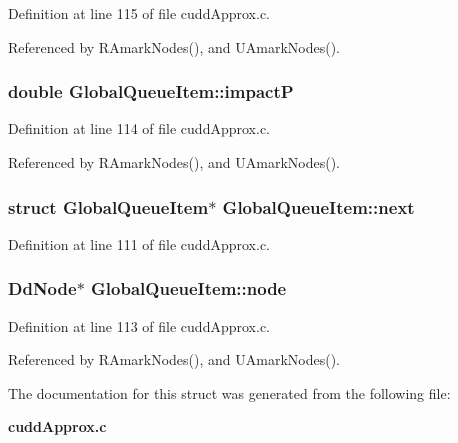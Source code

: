 Definition at line 115 of file cudd\-Approx.c.

Referenced by RAmark\-Nodes(), and UAmark\-Nodes().
\subsubsection{\setlength{\rightskip}{0pt plus 5cm}double \bf{Global\-Queue\-Item::impact\-P}}\label{structGlobalQueueItem_af69107e892c65c057366bc7dab47996}




Definition at line 114 of file cudd\-Approx.c.

Referenced by RAmark\-Nodes(), and UAmark\-Nodes().
\subsubsection{\setlength{\rightskip}{0pt plus 5cm}struct \bf{Global\-Queue\-Item}$\ast$ \bf{Global\-Queue\-Item::next}}\label{structGlobalQueueItem_bd73f6137b450535465691be9a5a2461}




Definition at line 111 of file cudd\-Approx.c.
\subsubsection{\setlength{\rightskip}{0pt plus 5cm}\bf{Dd\-Node}$\ast$ \bf{Global\-Queue\-Item::node}}\label{structGlobalQueueItem_fb1b20e45f709cfabc76fba4cfd66919}




Definition at line 113 of file cudd\-Approx.c.

Referenced by RAmark\-Nodes(), and UAmark\-Nodes().

The documentation for this struct was generated from the following file:\begin{CompactItemize}
\item 
\bf{cudd\-Approx.c}\end{CompactItemize}
